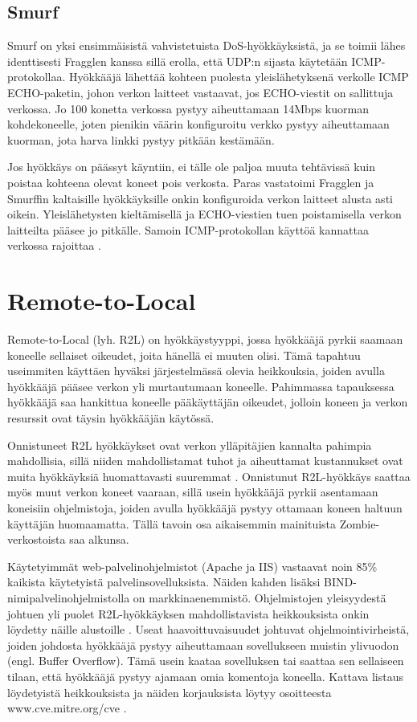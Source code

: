 \subsection{Smurf}

Smurf on yksi ensimmäisistä vahvistetuista DoS-hyökkäyksistä, ja se
toimii lähes identtisesti Fragglen kanssa sillä erolla, että UDP:n
sijasta käytetään ICMP-protokollaa. Hyökkääjä lähettää kohteen
puolesta yleislähetyksenä verkolle ICMP ECHO-paketin, johon verkon
laitteet vastaavat, jos ECHO-viestit on sallittuja verkossa. Jo 100
konetta verkossa pystyy aiheuttamaan 14Mbps kuorman kohdekoneelle,
joten pienikin väärin konfiguroitu verkko pystyy aiheuttamaan kuorman,
jota harva linkki pystyy pitkään kestämään\cite{hacking}.

Jos hyökkäys on päässyt käyntiin, ei tälle ole paljoa muuta tehtävissä
kuin poistaa kohteena olevat koneet pois verkosta. Paras vastatoimi
Fragglen ja Smurffin kaltaisille hyökkäyksille onkin konfiguroida
verkon laitteet alusta asti oikein. Yleislähetysten kieltämisellä ja
ECHO-viestien tuen poistamisella verkon laitteilta pääsee jo
pitkälle. Samoin ICMP-protokollan käyttöä kannattaa verkossa rajoittaa
\cite{hacking}.

\section{Remote-to-Local}

Remote-to-Local (lyh. R2L) on hyökkäystyyppi, jossa hyökkääjä pyrkii
saamaan koneelle sellaiset oikeudet, joita hänellä ei muuten
olisi. Tämä tapahtuu useimmiten käyttäen hyväksi järjestelmässä olevia
heikkouksia, joiden avulla hyökkääjä pääsee verkon yli murtautumaan
koneelle\cite{intru}. Pahimmassa tapauksessa hyökkääjä saa hankittua koneelle
pääkäyttäjän oikeudet, jolloin koneen ja verkon resurssit ovat täysin
hyökkääjän käytössä.

Onnistuneet R2L hyökkäykset ovat verkon ylläpitäjien kannalta pahimpia
mahdollisia, sillä niiden mahdollistamat tuhot ja aiheuttamat
kustannukset ovat muita hyökkäyksiä huomattavasti suuremmat
\cite{effect}. Onnistunut R2L-hyökkäys saattaa myös muut verkon koneet vaaraan,
sillä usein hyökkääjä pyrkii asentamaan koneisiin ohjelmistoja, joiden
avulla hyökkääjä pystyy ottamaan koneen haltuun käyttäjän
huomaamatta. Tällä tavoin osa aikaisemmin mainituista
Zombie-verkostoista saa alkunsa.

Käytetyimmät web-palvelinohjelmistot (Apache ja IIS) vastaavat noin
85\% kaikista käytetyistä palvelinsovelluksista. Näiden kahden lisäksi
BIND-ni\-mi\-pal\-ve\-lin\-oh\-jel\-mis\-tol\-la on markkinaenemmistö. Ohjelmistojen
yleisyydestä johtuen yli puolet R2L-hyökkäyksen mahdollistavista
heikkouksista onkin löydetty näille alustoille \cite{intru}. Useat
haavoittuvaisuudet johtuvat ohjelmointivirheistä, joiden johdosta
hyökkääjä pystyy aiheuttamaan sovellukseen muistin ylivuodon
(engl. Buffer Overflow). Tämä usein kaataa sovelluksen tai saattaa sen
sellaiseen tilaan, että hyökkääjä pystyy ajamaan omia komentoja
koneella. Kattava listaus löydetyistä heikkouksista ja näiden
korjauksista löytyy osoitteesta www.cve.mitre.org/cve \cite{cve}.

